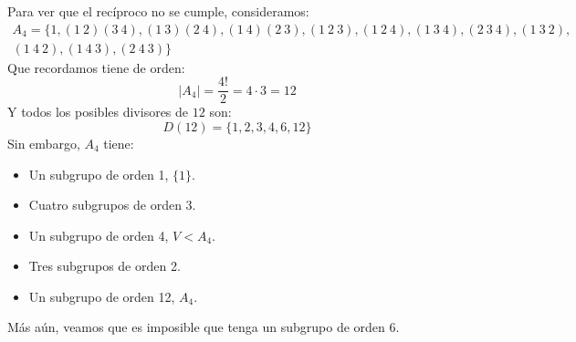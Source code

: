 \begin{ejemplo}\label{ejemplo:subgrupos_a4}
    Para ver que el recíproco no se cumple, consideramos:
    \begin{multline*}
        A_4 = \{1, (1\ 2)(3\ 4), (1\ 3)(2\ 4), (1\ 4)(2\ 3), (1\ 2\ 3), (1\ 2\ 4), (1\ 3\ 4), (2\ 3\ 4), (1\ 3\ 2),\\ (1\ 4\ 2), (1\ 4\ 3), (2\ 4\ 3)\}
    \end{multline*}
    Que recordamos tiene de orden:
    \begin{equation*}
        |A_4| = \dfrac{4!}{2} = 4\cdot 3 = 12
    \end{equation*}
    Y todos los posibles divisores de $12$ son:
    \begin{equation*}
        D(12) = \{1, 2, 3, 4, 6, 12\}
    \end{equation*}
    Sin embargo, $A_4$ tiene:
    \begin{itemize}
        \item Un subgrupo de orden 1, $\{1\}$.
        \item Cuatro subgrupos de orden 3.
        \item Un subgrupo de orden 4, $V < A_4$.
        \item Tres subgrupos de orden 2.
        \item Un subgrupo de orden 12, $A_4$.
    \end{itemize}
    Más aún, veamos que es imposible que tenga un subgrupo de orden 6.


\end{ejemplo}
